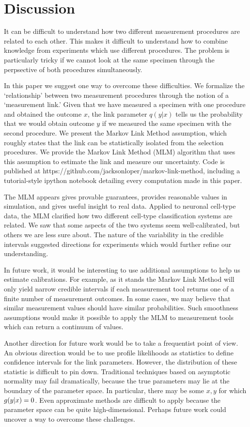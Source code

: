\section{Discussion}

It can be difficult to understand how two different measurement procedures are related to each other.  This makes it difficult to understand how to combine knowledge from experiments which use different procedures.  The problem is particularly tricky if we cannot look at the same specimen through the perpsective of both procedures simultaneously.

In this paper we suggest one way to overcome these difficulties.  We formalize the `relationship' between two measurement procedures through the notion of a `measurement link.'  Given that we have measured a specimen with one procedure and obtained the outcome $x$, the link parameter $q(y|x)$ tells us the probability that we would obtain outcome $y$ if we measured the same specimen with the second procedure.  We present the Markov Link Method assumption, which roughly states that the link can be statistically isolated from the selection procedures.  We provide the Markov Link Method (MLM) algorithm that uses this assumption to estimate the link and measure our uncertainty.  Code is published at https://github.com/jacksonloper/markov-link-method, including a tutorial-style ipython notebook detailing every computation made in this paper.

The MLM appears gives provable guarantees, provides reasonable values in simulation, and gives useful insight to real data.  Applied to neuronal cell-type data, the MLM clarified how two different cell-type classification systems are related.  We saw that some aspects of the two systems seem well-calibrated, but others we are less sure about.  The nature of the variability in the credible intervals suggested directions for experiments which would further refine our understanding.  

In future work, it would be interesting to use additional assumptions to help us estimate calibrations.  For example, as it stands the Markov Link Method will only yield narrow credible intervals if each measurement tool returns one of a finite number of measurement outcomes.  In some cases, we may believe that similar measurement values should have similar probabilities.  Such smoothness assumptions would make it possible to apply the MLM to measurement tools which can return a continuum of values.   

Another direction for future work would be to take a frequentist point of view.  An obvious direction would be to use profile likelihoods as statistics to define confidence intervals for the link parameters.  However, the distribution of these statistic is difficult to pin down.  Traditional techniques based on asymptotic normality may fail dramatically, because the true parameters may lie at the boundary of the parameter space.  In particular, there may be some $x,y$ for which $g(y|x)=0$.  Even approximate methods are difficult to apply because the parameter space can be quite high-dimensional.  Perhaps future work could uncover a way to overcome these challenges.

